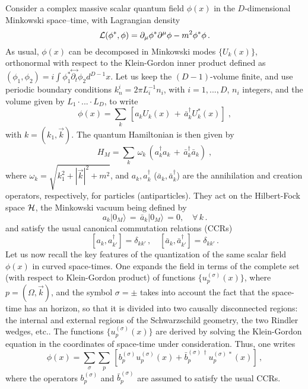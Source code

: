 \noindent Consider a complex massive scalar quantum field
$\phi(x)$ in the $D$-dimensional Minkowski space--time, with
Lagrangian density
 \begin{equation}\label{lagrangian}
   {\cal L}(\phi^*, \phi)=\partial_\mu \phi^*\partial^\mu
 \phi-m^2\phi^*\phi\,.
 \end{equation}
As usual, $\phi(x)$ can be decomposed in Minkowski modes
$\{U_k(x)\}$, orthonormal with respect to the Klein-Gordon inner
product defined as $(\phi_1, \phi_2)=i\int
\phi_1^*\stackrel{\leftrightarrow}{\partial_t}\phi_2 d^{D-1}x$.
Let us keep the $(D-1)$-volume finite, and use periodic boundary
conditions $\displaystyle{k^i_{n} = 2\pi L^{-1}_i} n_i$, with
$i=1,...,D$, $n_i$ integers, and the volume given by $L_1 \cdot
... \cdot L_D$, to write
 \begin{equation}\label{2}
 \phi(x)=\sum_k \,
 [a_{k}U_k(x)\,+\,\bar{a}_k^{\dagger}U_k^{*}(x)] \;,
 \end{equation}
with $k=(k_1, \vec{k})$. The quantum Hamiltonian is then given by
 \begin{equation} \label{hammink}
 H_M=\sum_k\,\omega_k\,
 (a_k^{\dagger}a_k\,+\,\bar{a}_k^{\dagger}\bar{a}_k) \;,
 \end{equation}
where $\omega_k= \sqrt{k_1^2+|\vec{k}|^2+m^2}$, and $a_k,
a^\dagger_k$  ($\bar{a}_k,\bar{a}_k^{\dagger}$) are the
annihilation and creation operators, respectively, for particles
(antiparticles). They act on the Hilbert-Fock space $\cal H$, the
Minkowski vacuum being defined by
 \begin{equation}\label{4}
 a_k|0_M\rangle\,=\,\bar{a}_k|0_M\rangle\,=0, \quad \forall \,k\,{.}
 \end{equation}
and satisfy the usual canonical commutation relations (CCRs)
 \[
 [a_k, a_{k'}^\dag]=\delta_{kk'}\,, \quad [\bar{a}_k,
 \bar{a}_{k'}^\dag]=\delta_{kk'}\,.
 \]
Let us now recall the key features of the quantization of the same
scalar field $\phi(x)$ in curved space-times. One expands the
field in terms of the complete set (with respect to Klein-Gordon
product) of functions $\{u_p^{(\sigma)}(x)\}$, where $p=(\Omega,
{\vec k})$, and the symbol $\sigma = \pm$ takes into account the
fact that the space-time has an horizon, so that it is divided
into two causally disconnected regions: the internal and external
regions of the Schwarzschild geometry, the two Rindler wedges,
etc.. The functions $\{u_p^{(\sigma)}(x)\}$ are derived by solving
the Klein-Gordon equation in the coordinates of space-time under
consideration. Thus, one writes
\begin{equation}\label{phiR}
  \phi(x)= \sum_\sigma \sum_p \, \left[
  b_p^{(\sigma)}u_p^{(\sigma)}(x)+
  {\bar b}_p^{(\sigma)\, \dagger}u_p^{(\sigma)\, *}(x)
  \right]\,,
\end{equation}
where the operators $b_p^{(\sigma)}$ and ${\bar b}_p^{(\sigma)}$
are assumed to satisfy the usual CCRs.

